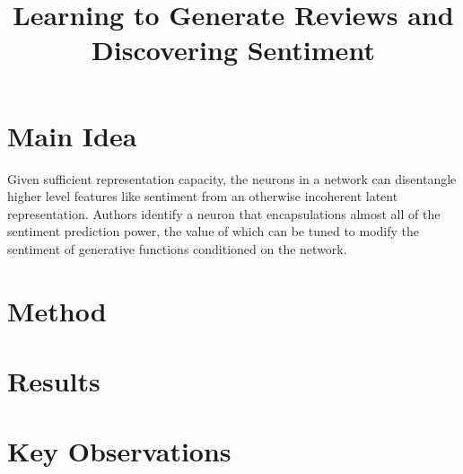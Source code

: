 \documentclass[12pt]{article}
\begin{document}
\title{Learning to Generate Reviews and Discovering Sentiment}
\author{}
\date{}
\maketitle

\section{Main Idea}
  Given sufficient representation capacity, the neurons in a network can disentangle higher level features like sentiment from an otherwise incoherent latent representation. Authors identify a neuron that encapsulations almost all of the sentiment prediction power, the value of which can be tuned to modify the sentiment of generative functions conditioned on the network.

\section{Method}


\section{Results}


\section{Key Observations}




\end{document}
